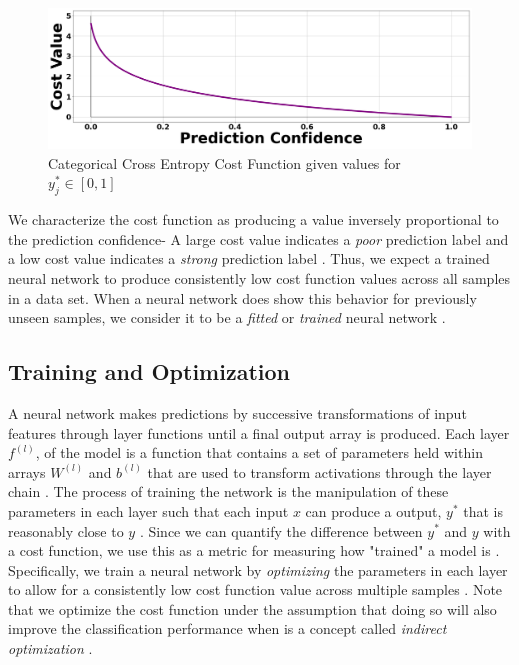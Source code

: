 \documentclass[conference,onecolumn,letterpaper]{IEEEtran}
\begin{document}
\begin{figure}[h]
    \centering
    \includegraphics[scale=0.14]{figures/CXELoss.png}
    \caption{Categorical Cross Entropy Cost Function given values for $y^*_{j} \in [0,1]$}
    \label{fig:CXELoss}
\end{figure}

We characterize the cost function as producing a value inversely proportional to the prediction confidence- A large cost value indicates a \textit{poor} prediction label and a low cost value indicates a \textit{strong} prediction label \cite{James,Virtanen}. Thus, we expect a trained neural network to produce consistently low cost function values across all samples in a data set. When a neural network does show this behavior for previously unseen samples, we consider it to be a \textit{fitted} or \textit{trained} neural network \cite{Geron,Goodfellow,James}.


\subsection{Training and Optimization}
\label{subsec:Training}

A neural network makes predictions by successive transformations of input features through layer functions until a final output array is produced. Each layer $f^{(l)}$, of the model is a function that contains a set of parameters held within arrays $W^{(l)}$ and $b^{(l)}$ that are used to transform activations through the layer chain \cite{Goodfellow}. The process of training the network is the manipulation of these parameters in each layer such that each input $x$ can produce a output, $y^*$ that is reasonably close to $y$ \cite{Geron,Virtanen}. Since we can quantify the difference between $y^*$ and $y$ with a cost function, we use this as a metric for measuring how "trained" a model is \cite{James}. Specifically, we train a neural network by \textit{optimizing} the parameters in each layer to allow for a consistently low cost function value across multiple samples \cite{Geron,Goodfellow}. Note that we optimize the cost function under the assumption that doing so will also improve the classification performance when is a concept called \textit{indirect optimization} \cite{Goodfellow}.
\end{document}
